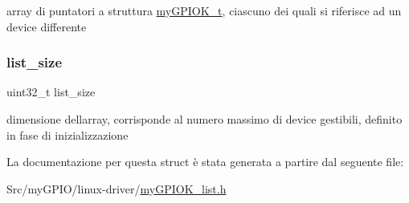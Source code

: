 array di puntatori a struttura \hyperlink{structmy_g_p_i_o_k__t}{my\+G\+P\+I\+O\+K\+\_\+t}, ciascuno dei quali si riferisce ad un device differente \mbox{\label{structmy_g_p_i_o_k__list__t_aeff61809685e5df1b38aec1d871a49bb}} 
\subsubsection{\texorpdfstring{list\+\_\+size}{list\_size}}
{\footnotesize\ttfamily uint32\+\_\+t list\+\_\+size}

dimensione dell\textquotesingle{}array, corrisponde al numero massimo di device gestibili, definito in fase di inizializzazione 

La documentazione per questa struct è stata generata a partire dal seguente file\+:\begin{DoxyCompactItemize}
\item 
Src/my\+G\+P\+I\+O/linux-\/driver/\hyperlink{my_g_p_i_o_k__list_8h}{my\+G\+P\+I\+O\+K\+\_\+list.\+h}\end{DoxyCompactItemize}
